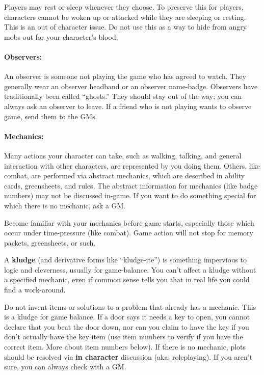 \documentclass[sheet]{GL2020}
\begin{document}
Players may rest or sleep whenever they choose. To preserve this for players, characters cannot be woken up or attacked while they are sleeping or resting. This is an out of character issue. Do not use this as a way to hide from angry mobs out for your character’s blood.

\paragraph{Observers:} An observer is someone not playing the game who has agreed to watch.  They generally wear an observer headband or an observer name-badge.  Observers have traditionally been called ``ghosts.''  They should stay out of the way; you can always ask an observer to leave.  If a friend who is not playing wants to observe game, send them to the GMs.

\clearpage
\paragraph{Mechanics:} Many actions your character can take, such as walking, talking, and general interaction with other characters, are represented by you doing them.  Others, like combat, are performed via abstract mechanics, which are described in ability cards, greensheets, and rules.  The abstract information for mechanics (like badge numbers) may not be discussed in-game.  If you want to do something special for which there is no mechanic, ask a GM.

Become familiar with your mechanics before game starts, especially those which occur under time-pressure (like combat).  Game action will not stop for memory packets, greensheets, or such.

A \textbf{kludge} (and derivative forms like ``kludge-ite'') is something impervious to logic and cleverness, usually for game-balance.  You can't affect a kludge without a specified mechanic, even if common sense tells you that in real life you could find a work-around.

Do not invent items or solutions to a problem that already has a mechanic. This is a kludge for game balance. If a door says it needs a key to open, you cannot declare that you beat the door down, nor can you claim to have the key if you don't actually have the key item (use item numbers to verify if you have the correct item. More about item numbers below).  If there is no mechanic, plots should be resolved via \textbf{in character} discussion (aka: roleplaying). If you aren’t sure, you can always check with a GM. 
\end{document}
